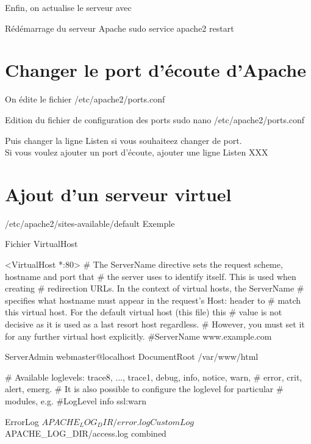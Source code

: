 {Enfin, on actualise le serveur avec

\begin{Bash}{Rédémarrage du serveur Apache}
sudo service apache2 restart
\end{Bash}

\section{Changer le port d'écoute d'Apache}

On édite le fichier /etc/apache2/ports.conf

\begin{Bash}{Edition du fichier de configuration des ports}
sudo nano /etc/apache2/ports.conf
\end{Bash}
Puis changer la ligne Listen si vous souhaiteez changer de port.\\
Si vous voulez ajouter un port d'écoute, ajouter une ligne Listen XXX


\section{Ajout d'un serveur virtuel}

/etc/apache2/sites-available/default
Exemple
\begin{Bash}{Fichier VirtualHost}


<VirtualHost *:80>
        # The ServerName directive sets the request scheme, hostname and port that
        # the server uses to identify itself. This is used when creating
        # redirection URLs. In the context of virtual hosts, the ServerName
        # specifies what hostname must appear in the request's Host: header to
        # match this virtual host. For the default virtual host (this file) this
        # value is not decisive as it is used as a last resort host regardless.
        # However, you must set it for any further virtual host explicitly.
        #ServerName www.example.com

        ServerAdmin webmaster@localhost
        DocumentRoot /var/www/html

        # Available loglevels: trace8, ..., trace1, debug, info, notice, warn,
        # error, crit, alert, emerg.
        # It is also possible to configure the loglevel for particular
        # modules, e.g.
        #LogLevel info ssl:warn

        ErrorLog ${APACHE_LOG_DIR}/error.log
        CustomLog ${APACHE_LOG_DIR}/access.log combined


\end{Bash}}
